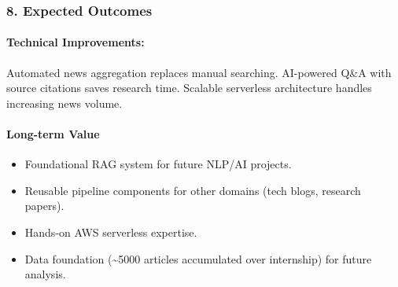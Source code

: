 \hypertarget{expected-outcomes}{%
\subsubsection{8. Expected Outcomes}}

\hypertarget{technical-improvements}{%
\paragraph{Technical Improvements:}}

Automated news aggregation replaces manual searching. AI-powered Q\&A
with source citations saves research time. Scalable serverless
architecture handles increasing news volume.

\hypertarget{long-term-value}{%
\paragraph{Long-term Value}}

\begin{itemize}
\tightlist
\item
  Foundational RAG system for future NLP/AI projects.
\item
  Reusable pipeline components for other domains (tech blogs, research
  papers).
\item
  Hands-on AWS serverless expertise.
\item
  Data foundation (\textasciitilde5000 articles accumulated over
  internship) for future analysis.
\end{itemize}
